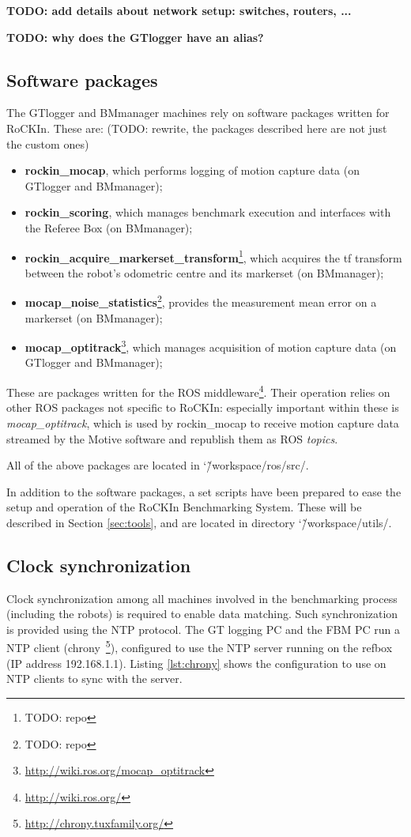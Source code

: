\documentclass[a4paper]{article}
\newcommand{\ro}{RoCKIn}
\newcommand{\rbs}{RoCKIn Benchmarking System}
\newcommand{\srcdir}{\char`\~/workspace/ros/src/}
\newcommand{\toolsdir}{\char`\~/workspace/utils/}
\begin{document}
\textbf{TODO: add details about network setup: switches, routers, ...}

\textbf{TODO: why does the GTlogger have an alias?
}

\subsection{Software packages}
\label{sec:sw}
The GTlogger and BMmanager machines rely on software packages written for \ro. These are: (TODO: rewrite, the packages described here are not just the custom ones)
\begin{itemize}
\item \textbf{rockin\_mocap}, which performs logging of motion capture data (on GTlogger and BMmanager);
\item \textbf{rockin\_scoring}, which manages benchmark execution and interfaces with the Referee Box (on BMmanager);
\item \textbf{rockin\_acquire\_markerset\_transform}\footnote{TODO: repo}, which acquires the tf transform between the robot's odometric centre and its markerset (on BMmanager);
\item \textbf{mocap\_noise\_statistics}\footnote{TODO: repo}, provides the measurement mean error on a markerset (on BMmanager);
\item \textbf{mocap\_optitrack}\footnote{\url{http://wiki.ros.org/mocap_optitrack}}, which manages acquisition of motion capture data (on GTlogger and BMmanager);
\end{itemize}

These are packages written for the ROS middleware\footnote{\url{http://wiki.ros.org/}}. Their operation relies on other ROS packages not specific to \ro: especially important within these is \textit{mocap\_optitrack}, which is used by rockin\_mocap to receive motion capture data streamed by the Motive software and republish them as ROS \textit{topics}.

All of the above packages are located in \srcdir.

In addition to the software packages, a set scripts have been prepared to ease the setup and operation of the \rbs. These will be described in Section \ref{sec:tools}, and are located in directory \toolsdir.

\subsection{Clock synchronization}
Clock synchronization among all machines involved in the benchmarking process (including the robots) is required to enable data matching. Such synchronization is provided using the NTP protocol.
The GT logging PC and the FBM PC run a NTP client (chrony~\footnote{\url{http://chrony.tuxfamily.org/}}), configured to use the NTP server running on the \ro@Home refbox (IP address 192.168.1.1).
Listing \ref{lst:chrony} shows the configuration to use on NTP clients to sync with the server.
\end{document}
